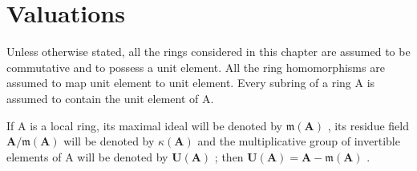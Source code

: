 \chapter{Valuations}

Unless otherwise stated, all the rings considered in this chapter are assumed to be commutative and to possess a unit element. All the ring homomorphisms are assumed to map unit element to unit element. Every subring of a ring A is assumed to contain the unit element of A.

If A is a local ring, its maximal ideal will be denoted by \(\mathfrak{m}(\mathbf{A})\) , its residue field \(\mathbf{A}/\mathfrak{m}(\mathbf{A})\) will be denoted by \(\kappa(\mathbf{A})\) and the multiplicative group of invertible elements of A will be denoted by \(\mathbf{U}(\mathbf{A})\) ; then \(\mathbf{U}(\mathbf{A}) = \mathbf{A} - \mathfrak{m}(\mathbf{A})\) .


